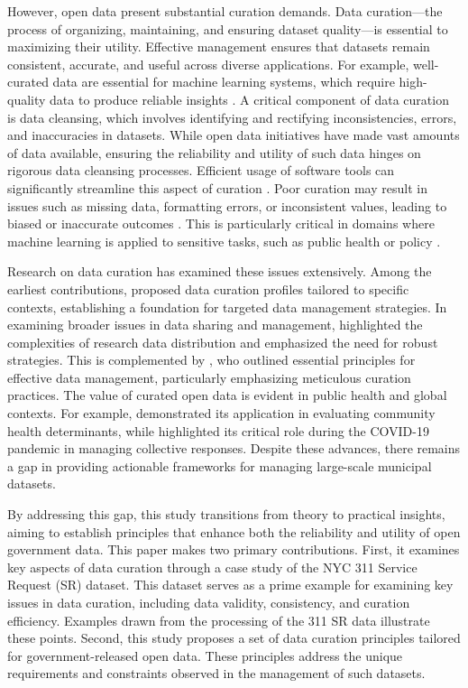 \documentclass[linenumber]{jdsart}
\begin{document}
However, open data present substantial curation demands.
Data curation—the process of organizing, maintaining, and ensuring
dataset quality—is essential to maximizing their utility.
Effective management ensures that datasets remain consistent,
accurate, and useful across diverse applications.
For example, well-curated data are essential for machine learning systems, which 
require high-quality data to produce reliable insights 
\citep{polyzotis2019data, jain2020overview}. A critical component of 
data curation is data cleansing, which involves identifying and rectifying 
inconsistencies, errors, and inaccuracies in datasets. While open data 
initiatives have made vast amounts of data available, ensuring the 
reliability and utility of such data hinges on rigorous data cleansing processes. 
Efficient usage of software tools can significantly streamline this 
aspect of curation \citep[e.g.,][]{cody2017cody, van2018statistical}. Poor 
curation may result in issues such as missing data, formatting errors, 
or inconsistent values, leading to biased or inaccurate outcomes 
\citep{geiger2020garbage}. This is particularly critical in domains 
where machine learning is applied to sensitive tasks, such as public 
health or policy \citep{rahm2000data}. 


Research on data curation has examined these issues extensively.
Among the earliest contributions, \citet{witt2009constructing}
proposed data curation profiles tailored to specific contexts,
establishing a foundation for targeted data management strategies.
In examining broader issues in data sharing and management,
\citet{borgman2012conundrum} highlighted the complexities of
research data distribution and emphasized the need for robust strategies.
This is complemented by \citet{hart2016ten}, who outlined 
essential principles for effective data management, particularly 
emphasizing meticulous curation practices. The value of curated 
open data is evident in public health and global contexts. For 
example, \citet{cantor2018facets} demonstrated its application in evaluating
community health determinants, while \citet{shankar2021data} highlighted
its critical role during the COVID-19 pandemic in managing collective responses.
Despite these advances, there remains a gap in providing
actionable frameworks for managing large-scale municipal datasets.


By addressing this gap, this study transitions from theory to
practical insights, aiming to establish principles that enhance both
the reliability and utility of open government data.
This paper makes two primary contributions. First, it examines 
key aspects of data curation through a case study
of the NYC 311 Service Request (SR) dataset.
 This dataset serves as a prime example for examining key issues 
 in data curation, including data validity, consistency, and curation 
 efficiency. Examples drawn from the processing of the 311 SR 
 data illustrate these points. Second, this study proposes a 
 set of data curation principles tailored for government-released 
 open data. These principles address the unique requirements and 
constraints observed in the management of such datasets.
\end{document}
